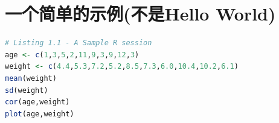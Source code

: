\section{一个简单的示例(不是Hello World)}
\begin{lstlisting}[language=R, basicstyle=\ttfamily\small, backgroundcolor=\color{gray!10}, frame=leftline, xleftmargin=2em]
    # Listing 1.1 - A Sample R session
age <- c(1,3,5,2,11,9,3,9,12,3)
weight <- c(4.4,5.3,7.2,5.2,8.5,7.3,6.0,10.4,10.2,6.1)
mean(weight)
sd(weight)
cor(age,weight)
plot(age,weight)

\end{lstlisting}

